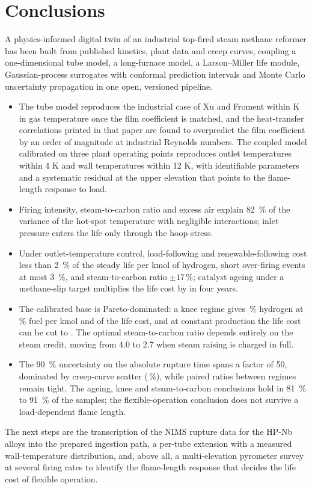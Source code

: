 \section{Conclusions}
\label{sec:conclusions}

A physics-informed digital twin of an industrial top-fired steam methane reformer has been built from published kinetics, plant data
and creep curves, coupling a one-dimensional tube model, a long-furnace model, a Larson--Miller life module, Gaussian-process
surrogates with conformal prediction intervals and Monte Carlo uncertainty propagation in one open, versioned pipeline.

\begin{itemize}
\item The tube model reproduces the industrial case of Xu and Froment within \xfRMSET{} K in gas temperature once the film
  coefficient is matched, and the heat-transfer correlations printed in that paper are found to overpredict the film coefficient by an
  order of magnitude at industrial Reynolds numbers. The coupled model calibrated on three plant operating points reproduces outlet
  temperatures within 4 K and wall temperatures within 12 K, with identifiable parameters and a systematic residual at the upper
  elevation that points to the flame-length response to load.
\item Firing intensity, steam-to-carbon ratio and excess air explain \SI{82}{\percent} of the variance of the hot-spot temperature
  with negligible interactions; inlet pressure enters the life only through the hoop stress.
\item Under outlet-temperature control, load-following and renewable-following cost less than \SI{2}{\percent} of the steady life per
  kmol of hydrogen, short over-firing events at most \SI{3}{\percent}, and steam-to-carbon ratio $\pm 17$\,\%; catalyst ageing
  under a methane-slip target multiplies the life cost by \SxAgeSlip{} in four years.
\item The calibrated base is Pareto-dominated: a knee regime gives \kneeHtwo{}\,\% hydrogen at \kneeFuel{}\,\% fuel per kmol and
  \kneeLife{} of the life cost, and at constant production the life cost can be cut to \isoLife{}. The optimal steam-to-carbon ratio
  depends entirely on the steam credit, moving from 4.0 to 2.7 when steam raising is charged in full.
\item The \SI{90}{\percent} uncertainty on the absolute rupture time spans a factor of 50, dominated by creep-curve scatter
  (\shareCreep{}\,\%), while paired ratios between regimes remain tight. The ageing, knee and steam-to-carbon conclusions hold in
  \SI{81}{\percent} to \SI{91}{\percent} of the samples; the flexible-operation conclusion does not survive a load-dependent flame
  length.
\end{itemize}

The next steps are the transcription of the NIMS rupture data for the HP-Nb alloys into the prepared ingestion path, a per-tube
extension with a measured wall-temperature distribution, and, above all, a multi-elevation pyrometer survey at several firing
rates to identify the flame-length response that decides the life cost of flexible operation.
